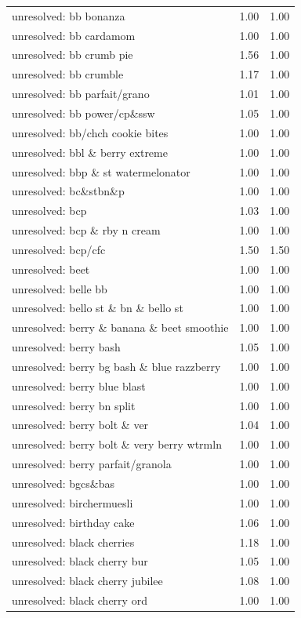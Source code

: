 \begin{table}
\begin{tabular}{lrr}
unresolved: bb bonanza & 1.00 & 1.00 \\
unresolved: bb cardamom & 1.00 & 1.00 \\
unresolved: bb crumb pie & 1.56 & 1.00 \\
unresolved: bb crumble & 1.17 & 1.00 \\
unresolved: bb parfait/grano & 1.01 & 1.00 \\
unresolved: bb power/cp\&ssw & 1.05 & 1.00 \\
unresolved: bb/chch cookie bites & 1.00 & 1.00 \\
unresolved: bbl \& berry extreme & 1.00 & 1.00 \\
unresolved: bbp \& st watermelonator & 1.00 & 1.00 \\
unresolved: bc\&stbn\&p & 1.00 & 1.00 \\
unresolved: bcp & 1.03 & 1.00 \\
unresolved: bcp \& rby n cream & 1.00 & 1.00 \\
unresolved: bcp/cfc & 1.50 & 1.50 \\
unresolved: beet & 1.00 & 1.00 \\
unresolved: belle bb & 1.00 & 1.00 \\
unresolved: bello st \& bn \& bello st & 1.00 & 1.00 \\
unresolved: berry \& banana \& beet smoothie & 1.00 & 1.00 \\
unresolved: berry bash & 1.05 & 1.00 \\
unresolved: berry bg bash \& blue razzberry & 1.00 & 1.00 \\
unresolved: berry blue blast & 1.00 & 1.00 \\
unresolved: berry bn split & 1.00 & 1.00 \\
unresolved: berry bolt \& ver & 1.04 & 1.00 \\
unresolved: berry bolt \& very berry wtrmln & 1.00 & 1.00 \\
unresolved: berry parfait/granola & 1.00 & 1.00 \\
unresolved: bgcs\&bas & 1.00 & 1.00 \\
unresolved: birchermuesli & 1.00 & 1.00 \\
unresolved: birthday cake & 1.06 & 1.00 \\
unresolved: black cherries & 1.18 & 1.00 \\
unresolved: black cherry bur & 1.05 & 1.00 \\
unresolved: black cherry jubilee & 1.08 & 1.00 \\
unresolved: black cherry ord & 1.00 & 1.00 \\

\end{tabular}
\end{table}
